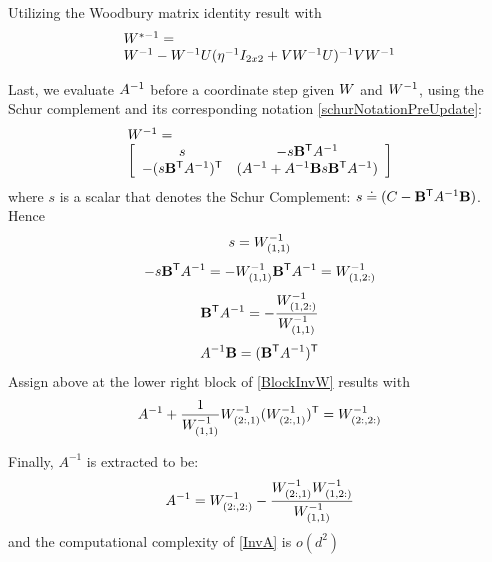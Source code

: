 \documentclass{article}
\begin{document}
Utilizing the Woodbury matrix identity result with
\begin{equation}
\begin{array}{lcl}
{W}^{*-1} = \\
{W}^{-1} - {W}^{-1} {U} (\eta^{-1} I_{2x2} + {V} {W}^{-1} {U})^{-1} {V} {W}^{-1}
\end{array}
\label{InvWwdb}
\end{equation}


Last, we evaluate ${A}^{-1}$ before a coordinate step given ${W}$ and ${W}^{-1}$, using the Schur complement and its corresponding notation \eqref{schurNotationPreUpdate}:
\begin{equation}
\begin{array}{l}
 {W}^{-1} =  \\
 \left[ \begin{array}{cc} s & -s \mathbf{B}{}^\mathsf{T} {A}^{-1} \\ -(s \mathbf{B}{}^\mathsf{T} {A}^{-1} ){}^\mathsf{T} & ({A}^{-1} + {A}^{-1} \mathbf{B} s \mathbf{B}{}^\mathsf{T} {A}^{-1} ) \end{array}  \right]
\end{array}
\label{BlockInvW}
\end{equation}
where $s$ is a scalar that denotes the Schur Complement:  $s \doteq ({C}-\mathbf{B}{}^\mathsf{T} {A}^{-1} \mathbf{B})$. Hence
\begin{equation}
s = {W}^{-1}_{(1,1)}
\label{invWkk}
\end{equation}
\begin{equation}
-s \mathbf{B}{}^\mathsf{T} {A}^{-1} = -{W}^{-1}_{(1,1)} \mathbf{B}{}^\mathsf{T} {A}^{-1} = {W}^{-1}_{(1,2:)}
\end{equation}
\begin{equation}
\mathbf{B}{}^\mathsf{T} {A}^{-1} = -\frac{{W}^{-1}_{(1,2:)}}{{W}^{-1}_{(1,1)} }
\end{equation}
\begin{equation}
{A}^{-1}\mathbf{B} = (\mathbf{B}{}^\mathsf{T} {A}^{-1}){}^\mathsf{T}
\label{invA_Btrans}
\end{equation}
Assign above at the lower right block of \eqref{BlockInvW} results with
\begin{equation}
 {A}^{-1} + \frac{1}{{W}^{-1}_{(1,1)} } {W}^{-1}_{(2:,1)} ({W}^{-1}_{(2:,1)}){}^\mathsf{T} = {W}^{-1}_{(2:,2:)}
\end{equation}

Finally, $A^{-1}$ is extracted to be:
\begin{equation}
{A}^{-1} = {W}^{-1}_{(2:,2:)}- \frac{{W}^{-1}_{(2:,1)} {W}^{-1}_{(1,2:)}}{{W}^{-1}_{(1,1)}}
\label{InvA}
\end{equation}
and the computational complexity of \eqref{InvA} is $o(d^2)$
\end{document}
